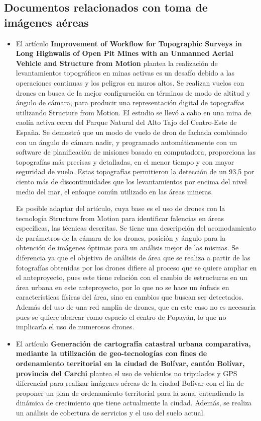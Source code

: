 \subsection{Documentos relacionados con toma de imágenes aéreas}
 \begin{itemize}
        \item El artículo \textbf{Improvement of Workflow for Topographic Surveys in Long Highwalls of Open Pit Mines with an Unmanned Aerial Vehicle and Structure from Motion}  \cite{rs13173353} plantea la realización de levantamientos topográficos en minas activas es un desafío debido a las operaciones continuas y los peligros en muros altos. Se realizan vuelos con drones en busca de la mejor configuración en términos de modo de altitud y ángulo de cámara, para producir una representación digital de topografías utilizando Structure from Motion. El estudio se llevó a cabo en una mina de caolín activa cerca del Parque Natural del Alto Tajo del Centro-Este de España. Se demostró que un modo de vuelo de dron de fachada combinado con un ángulo de cámara nadir, y programado automáticamente con un software de planificación de misiones basado en computadora, proporciona las topografías más precisas y detalladas, en el menor tiempo y con mayor seguridad de vuelo. Estas topografías permitieron la detección de un 93,5 por ciento más de discontinuidades que los levantamientos por encima del nivel medio del mar, el enfoque común utilizado en las áreas mineras. 
        
        Es posible adaptar del artículo, cuya base es el uso de drones con la tecnología Structure from Motion para identificar falencias en áreas específicas, las técnicas descritas. Se tiene una descripción del acomodamiento de parámetros de la cámara de los drones, posición y ángulo para la obtención de imágenes óptimas para un análisis mejor de las mismas. Se diferencia ya que el objetivo de análisis de área que se realiza a partir de las fotografías obtenidas por los drones difiere al proceso que se quiere ampliar en el anteproyecto, pues este tiene relación con el cambio de estructuras en un área urbana en este anteproyecto, por lo que no se hace un énfasis en características físicas del área, sino en cambios que buscan ser detectados. Además del uso de una red amplia de drones, que en este caso no es necesaria pues se quiere abarcar como espacio el centro de Popayán, lo que no implicaría el uso de numerosos drones.
        
        \item El artículo \textbf{Generación de cartografía catastral urbana comparativa, mediante la utilización de geo-tecnologías con fines de ordenamiento territorial en la ciudad de Bolívar, cantón Bolívar, provincia del  Carchi} \cite{carrera_herrera_generacion_2018}  plantea el uso de vehículos no tripulados y GPS diferencial para realizar imágenes aéreas de la ciudad Bolívar con el fin de proponer un plan de ordenamiento territorial para la zona, entendiendo la dinámica de crecimiento que tiene actualmente la ciudad. Además, se realiza un análisis de cobertura de servicios y el uso del suelo actual.
        

\end{itemize}
